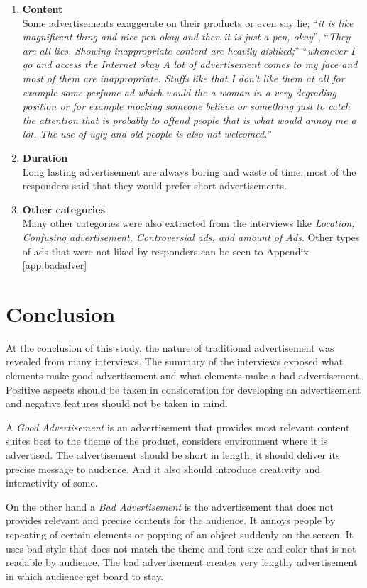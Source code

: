 \begin{enumerate}
\item \textbf{Content} \\
Some advertisements exaggerate on their products or even say lie; ``\emph{it is like magnificent thing and nice pen okay and then it is just a pen, okay}'', ``\emph{They are all lies. Showing inappropriate content are heavily disliked;}'' ``\emph{whenever I go and access the Internet okay A lot of advertisement comes to my face and most of them are inappropriate.
Stuffs like that I don't like them at all for example some perfume ad which would the a woman in a very degrading position or for example mocking someone believe or something just to catch the attention that is probably to offend people that is what would annoy me a lot. The use of ugly and old people is also not welcomed.}''

\item \textbf{Duration} \\
Long lasting advertisement are always boring and waste of time, most of the responders said that they would prefer short advertisements.

\item \textbf{Other categories} \\
Many other categories were also extracted from the interviews like \emph{Location, Confusing advertisement, Controversial ads, and amount of Ads}. Other types of ads that were not liked by responders can be seen to Appendix \ref{app:badadver} 

\end{enumerate}

\section{Conclusion} 
At the conclusion of this study, the nature of traditional advertisement was revealed from many interviews. The summary of the interviews exposed what elements make good advertisement and what elements make a bad advertisement. Positive aspects should be taken in consideration for developing an advertisement and negative features should not be taken in mind. 

A \emph{Good Advertisement} is an advertisement that provides most relevant content, suites best to the theme of the product, considers environment where it is advertised. The advertisement should be short in length; it should deliver its precise message to audience. And it also should introduce creativity and interactivity of some. 

On the other hand a \emph{Bad Advertisement} is the advertisement that does not provides relevant and precise contents for the audience. It annoys people by repeating of certain elements or popping of an object suddenly on the screen. It uses bad style that does not match the theme and font size and color that is not readable by audience. The bad advertisement creates very lengthy advertisement in which audience get board to stay. 

